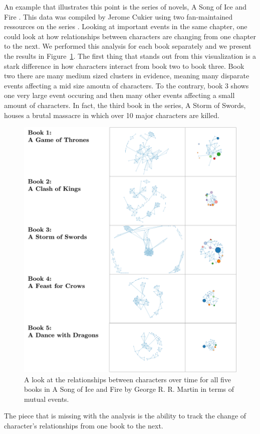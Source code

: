 \documentclass{article}\usepackage[]{graphicx}\usepackage[]{color}
\begin{document}
An example that illustrates this point is the series of novels, A Song of Ice and Fire \cite{martin1996game, martin1998clash, martin2000storm, martin2005feast, martin2011dance}. This data was compiled by Jerome Cukier using two fan-maintained ressources on the series \cite{cukier2012got}. Looking at important events in the same chapter, one could look at how relationships between characters are changing from one chapter to the next. We performed this analysis for each book separately and we present the results in Figure~\ref{fig:further_got}. The first thing that stands out from this visualization is a stark difference in how characters interact from book two to book three. Book two there are many medium sized clusters in evidence, meaning many disparate events affecting a mid size amoutn of characters. To the contrary, book 3 shows one very large event occuring and then many other events affecting a small amount of characters. In fact, the third book in the series, A Storm of Swords, houses a brutal massacre in which over 10 major characters are killed. 

\begin{figure}[H]
\centering
\includegraphics[width=\textwidth]{images/further_got.png}
\caption{\label{fig:further_got} A look at the relationships between characters over time for all five books in A Song of Ice and Fire by George R. R. Martin in terms of mutual events.}
\end{figure}

The piece that is missing with the analysis is the ability to track the change of character's relationships from one book to the next. 


\printbibliography
\end{document}
